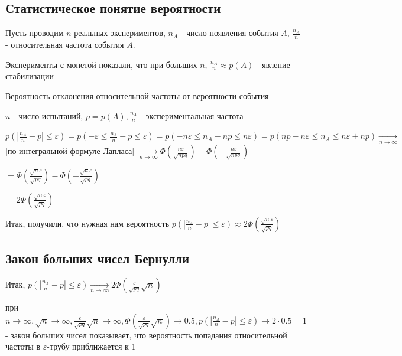 \documentclass[12pt]{article}
\begin{document}
    \subsection{Статистическое понятие вероятности}

    Пусть проводим $n$ реальных экспериментов, $n_A$ - число появления события $A$, $\frac{n_A}{n}$ - относительная частота события $A$.

    Эксперименты с монетой показали, что при больших $n$, $\frac{n_A}{n} \approx p(A)$ - явление стабилизации

    \hypertarget{probabilityofdeviation}{}

    Вероятность отклонения относительной частоты от вероятности события

    $n$ - число испытаний, $p = p(A), \frac{n_A}{n}$ - экспериментальная частота

    $p\left(|\frac{n_A}{n} - p| \leq \varepsilon\right) = p\left(-\varepsilon \leq \frac{n_A}{n} - p \leq \varepsilon\right) = p(-n\varepsilon \leq n_A - np \leq n\varepsilon) = p(np - n\varepsilon \leq n_A \leq n\varepsilon + np) \underset{n \to \infty}{\longrightarrow}$ [по интегральной формуле Лапласа] $\underset{n \to \infty}{\longrightarrow} \Phi\left(\frac{n\varepsilon}{\sqrt{npq}}\right) - \Phi\left(-\frac{n\varepsilon}{\sqrt{npq}}\right)$

    $ = \Phi\left(\frac{\sqrt{n}\varepsilon}{\sqrt{pq}}\right) - \Phi\left(-\frac{\sqrt{n}\varepsilon}{\sqrt{pq}}\right)$

    $ = 2\Phi\left(\frac{\sqrt{n}\varepsilon}{\sqrt{pq}}\right)$

    Итак, получили, что нужная нам вероятность $p\left(|\frac{n_A}{n} - p| \leq \varepsilon\right) \approx 2\Phi\left(\frac{\sqrt{n}\varepsilon}{\sqrt{pq}}\right)$

    \hypertarget{lawofbignumbersbernoulli}{}

    \subsection{Закон больших чисел Бернулли}

    Итак, $p\left(|\frac{n_A}{n} - p| \leq \varepsilon\right) \underset{n \to \infty}{\longrightarrow} 2 \Phi\left(\frac{\varepsilon}{\sqrt{pq}}\sqrt{n}\right)$

    при $n \to \infty, \sqrt{n} \to \infty, \frac{\varepsilon}{\sqrt{pq}} \sqrt{n} \to \infty, \Phi\left(\frac{\varepsilon}{\sqrt{pq}}\sqrt{n}\right) \to 0.5, p\left(|\frac{n_A}{n} - p| \leq \varepsilon\right) \to 2 \cdot 0.5 = 1$ - 
    закон больших чисел показывает, что вероятность попадания относительной частоты в $\varepsilon$-трубу приближается к 1
\end{document}
